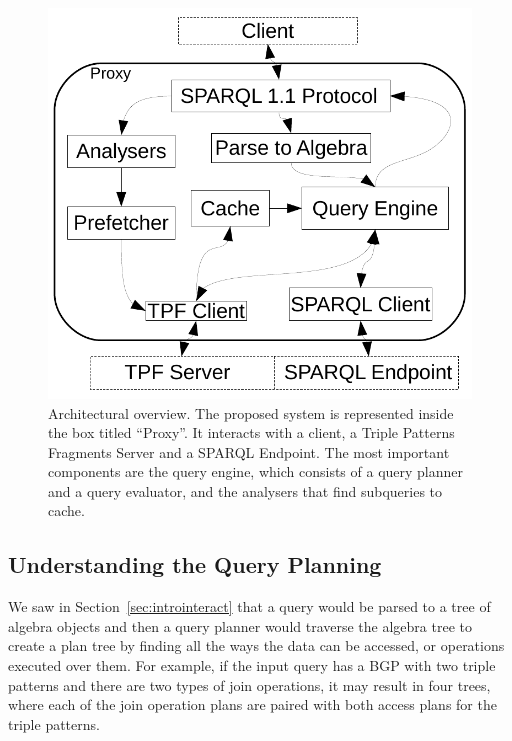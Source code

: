 \begin{figure}[h!]
\begin{center}
\includegraphics{architecture.pdf}
\caption{Architectural overview. The proposed system is represented
  inside the box titled ``Proxy''. It interacts with a client, a
  Triple Patterns Fragments Server and a SPARQL Endpoint. The most
  important components are the query engine, which consists of a query
  planner and a query evaluator, and the analysers that find
  subqueries to cache.}\label{fig:arch}
\end{center}
\end{figure}


\subsection{Understanding the Query Planning}\label{sec:understandquery}

We saw in Section~\ref{sec:introinteract} that a query would be parsed
to a tree of algebra objects and then a query planner would traverse
the algebra tree to create a plan tree by finding all the ways the
data can be accessed, or operations executed over them. For example,
if the input query has a BGP with two triple patterns and there are
two types of join operations, it may result in four trees, where each
of the join operation plans are paired with both access plans for the
triple patterns.

